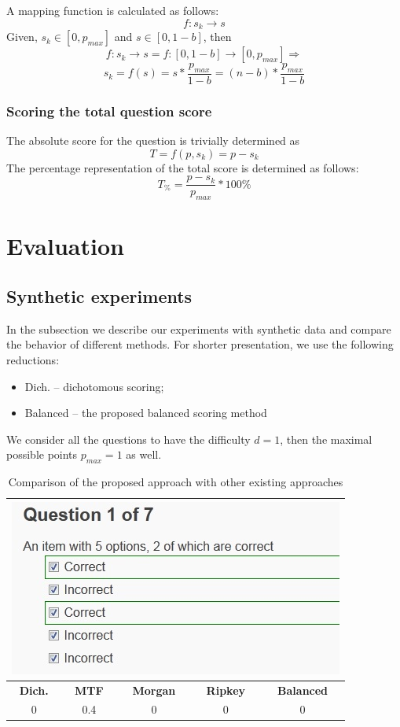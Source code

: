 A mapping function is calculated as follows:
\[f : s_k \rightarrow s\]
Given, $s_k \in [0,p_{max}]$ and $s \in [0,1-b]$, then 
\[f : s_k \rightarrow s = f : [0 , {1-b}] \rightarrow [0,p_{max}] \Rightarrow\]
\[s_k = f(s) = s*\frac{p_{max}}{1-b} = (n-b)*\frac{p_{max}}{1-b}\]

\subsubsection{Scoring the total question score}

The absolute score for the question is trivially determined as
\[T = f(p,s_k) = p-s_k \]
The percentage representation of the total score is determined as follows:
\[T_\% = \frac{p - s_k}{p_{max}}*100\%\]


\section{Evaluation}
\label{sec:experiments}

\subsection{Synthetic experiments}
\label{subsec:experiment}

In the subsection we describe our experiments with synthetic data and compare the behavior of different methods.
For shorter presentation, we use the following reductions:

\begin{itemize}
  \item{Dich.} -- dichotomous scoring;
  \item{Balanced} -- the proposed balanced scoring method
\end{itemize}

We consider all the questions to have the difficulty $d = 1$, then the maximal possible points $p_{max} = 1$ as well.

\begin{table}[h!]
	\centering
	\begin{tabularx}{0.5\columnwidth}{c c c c c}  
	\toprule  
    \multicolumn{5}{c}{\includegraphics[width=0.5\columnwidth]{images/case1.jpg}}\\
    \midrule
    \textbf{Dich.}&\textbf{MTF}&\textbf{Morgan}&\textbf{Ripkey}&\textbf{Balanced}\\
	\midrule
    0&0.4&0&0&0\\
	\bottomrule
    \end{tabularx}
	\caption{Comparison of the proposed approach with other existing approaches}
	\label{tab:case 1}
\end{table}

